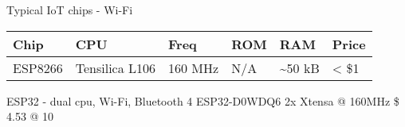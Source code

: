 \begin{frame}{Typical IoT chips - Wi-Fi}
\protect\hypertarget{typical-iot-chips---wi-fi}{}

\begin{longtable}[]{@{}llllll@{}}
\toprule
Chip & CPU & Freq & ROM & RAM & Price\tabularnewline
\midrule
\endhead
ESP8266 & Tensilica L106 & 160 MHz & N/A & \textasciitilde{}50 kB &
\textless{} \$1\tabularnewline
\bottomrule
\end{longtable}

ESP32 - dual cpu, Wi-Fi, Bluetooth 4 ESP32-D0WDQ6 2x Xtensa @ 160MHz \$
4.53 @ 10


\end{frame}

